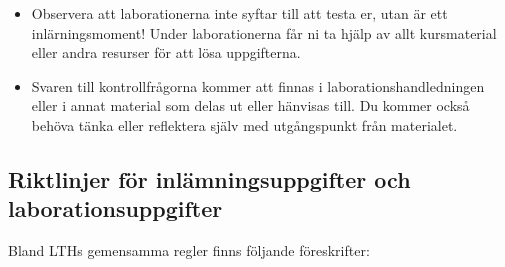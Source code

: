 \documentclass[fleqn, article, a4paper]{memoir}
\begin{document}
\begin{itemize}
	\item Observera att laborationerna inte syftar till att testa er, utan är ett inlärningsmoment! Under laborationerna får ni ta hjälp av allt kursmaterial eller andra resurser för att lösa uppgifterna.

	\item Svaren till kontrollfrågorna kommer att finnas i laborationshandledningen eller i annat material som delas ut eller hänvisas till. Du kommer också behöva tänka eller reflektera själv med utgångspunkt från materialet.
\end{itemize}




\newpage
\subsection*{Riktlinjer för inlämningsuppgifter och laborationsuppgifter}
Bland LTHs gemensamma regler finns följande föreskrifter:
\end{document}
